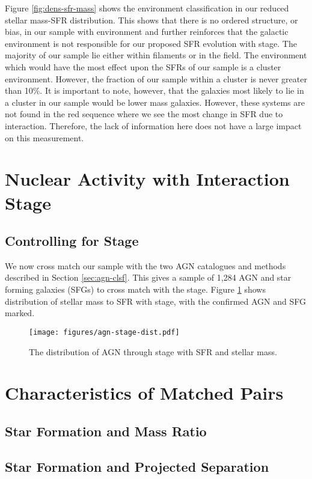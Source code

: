 \documentclass[fleqn,usenatbib]{mnras}
\begin{document}
Figure \ref{fig:dens-sfr-mass} shows the environment classification in our reduced stellar mass-SFR distribution. This shows that there is no ordered structure, or bias, in our sample with environment and further reinforces that the galactic environment is not responsible for our proposed SFR evolution with stage. The majority of our sample lie either within filaments or in the field. The environment which would have the most effect upon the SFRs of our sample is a cluster environment. However, the fraction of our sample within a cluster is never greater than 10\%. It is important to note, however, that the galaxies most likely to lie in a cluster in our sample would be lower mass galaxies. However, these systems are not found in the red sequence where we see the most change in SFR due to interaction. Therefore, the lack of information here does not have a large impact on this measurement. 

\section{Nuclear Activity with Interaction Stage}
\subsection{Controlling for Stage}
\noindent We now cross match our sample with the two AGN catalogues and methods described in Section \ref{sec:agn-clsf}. This gives a sample of 1,284 AGN and star forming galaxies (SFGs) to cross match with the stage. Figure \ref{fig:agn-stage} shows distribution of stellar mass to SFR with stage, with the confirmed AGN and SFG marked.

\begin{figure}
    \centering
    \texttt{[image: figures/agn-stage-dist.pdf]}
    \caption{The distribution of AGN through stage with SFR and stellar mass.}
    \label{fig:agn-stage}
\end{figure}

\section{Characteristics of Matched Pairs}
\subsection{Star Formation and Mass Ratio}

\subsection{Star Formation and Projected Separation}
\end{document}
